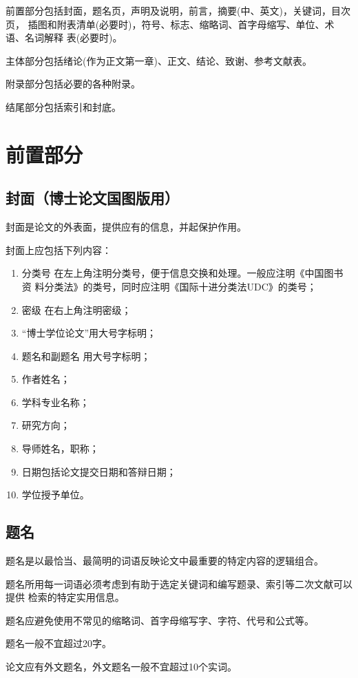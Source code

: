 \documentclass[master]{njuthesis}
\begin{document}
前置部分包括封面，题名页，声明及说明，前言，摘要(中、英文)，关键词，目次页，
插图和附表清单(必要时)，符号、标志、缩略词、首字母缩写、单位、术语、名词解释
表(必要时)。

主体部分包括绪论(作为正文第一章)、正文、结论、致谢、参考文献表。

附录部分包括必要的各种附录。

结尾部分包括索引和封底。

\section{前置部分}

\subsection{封面（博士论文国图版用）}

封面是论文的外表面，提供应有的信息，并起保护作用。

封面上应包括下列内容：
\begin{enumerate}
\item 分类号  在左上角注明分类号，便于信息交换和处理。一般应注明《中国图书资
  料分类法》的类号，同时应注明《国际十进分类法UDC》的类号；
\item 密级  在右上角注明密级；
\item “博士学位论文”用大号字标明；
\item 题名和副题名   用大号字标明；
\item 作者姓名；
\item 学科专业名称；
\item 研究方向；
\item 导师姓名，职称；
\item 日期包括论文提交日期和答辩日期；
\item 学位授予单位。
\end{enumerate}

\subsection{题名}

题名是以最恰当、最简明的词语反映论文中最重要的特定内容的逻辑组合。

题名所用每一词语必须考虑到有助于选定关键词和编写题录、索引等二次文献可以提供
检索的特定实用信息。

题名应避免使用不常见的缩略词、首字母缩写字、字符、代号和公式等。

题名一般不宜超过20字。

论文应有外文题名，外文题名一般不宜超过10个实词。
\end{document}
